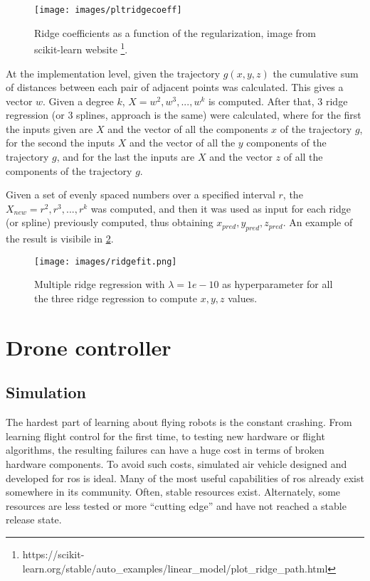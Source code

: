 \begin{figure}[H]
	\begin{minipage}{\textwidth}
		\centering
		\texttt{[image: images/pltridgecoeff]}
		\caption[Ridge coefficients as a function of the regularization.]{Ridge coefficients as a function of the regularization, image from scikit-learn website \footnote{https://scikit-learn.org/stable/auto\_examples/linear\_model/plot\_ridge\_path.html}.}
		\label{fig:pltridgecoeff}
	\end{minipage}
\end{figure}

\noindent At the implementation level, given the trajectory $g(x, y, z)$ the cumulative sum of distances between each pair of adjacent points was calculated. This gives a vector $w$. Given a degree $k$, $X = w^2, w^3,...,w^k$ is computed. After that, $3$ ridge regression (or $3$ splines, approach is the same) were calculated, where for the first the inputs given are $X$ and the vector of all the components $x$ of the trajectory $g$, for the second the inputs $X$ and the vector of all the $y$ components of the trajectory $g$, and for the last the inputs are $X$ and the vector $z$ of all the components of the trajectory $g$. 

\noindent Given a set of evenly spaced numbers over a specified interval $r$, the $X_{new} = r^2, r^3,...,r^k$ was computed, and then it was used as input for each ridge (or spline) previously computed, thus obtaining $x_{pred}, y_{pred}, z_{pred}$. An example of the result is visibile in \ref{fig:multiridge}.

\begin{figure}[H]
	\centering
	\texttt{[image: images/ridgefit.png]}
	\caption[Multiple Ridge regression.]{Multiple ridge regression with $\lambda = 1e-10$ as hyperparameter for all the three ridge regression to compute $x, y, z$ values.}
	\label{fig:multiridge}
\end{figure}

\section{Drone controller}
\label{sec:dronecontrl}

\subsection{Simulation}
\label{sec:simulation}

The hardest part of learning about flying robots is the constant crashing. From learning flight control for the first time, to testing new hardware or flight algorithms, the resulting failures can have a huge cost in terms of broken hardware components. To avoid such costs, simulated air vehicle designed and developed for \gls{ros} is ideal.  
Many of the most useful capabilities of \gls{ros} already exist somewhere in its community. Often, stable resources exist. Alternately, some resources are less tested or more “cutting edge” and have not reached a stable release state. \\


